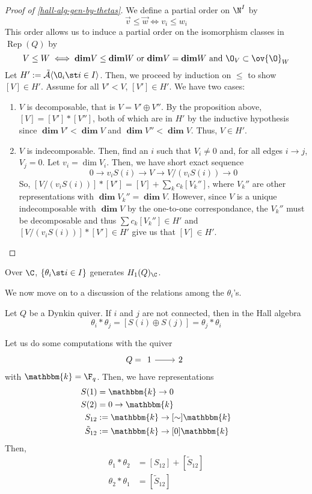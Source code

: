 \documentclass[11pt,leqno,oneside]{amsbook}
\numberwithin{thm}{section}
\newcommand{\bbk}{\mathbbm{k}} %
\newcommand{\Rep}{\operatorname{Rep}} %
\renewcommand{\Q}{Q} %
\newcommand{\grdim}{\boldsymbol{\dim}} %
\newcommand{\A}{\tilde{\mathcal{A}}}
\begin{document}
\begin{proof}[Proof of \ref{hall-alg-gen-by-thetas}]
  We define a partial order on \(\N^I\) by \[
    \vec{v} \leq \vec{w} \iff v_i \leq w_i
  \]
  This order allows us to induce a partial order on the isomorphism
  classes in \(\Rep(\Q)\) by \[
    V \leq W \iff \grdim V \leq \grdim W \text{ or } \grdim V = \grdim
    W \text{ and } \O_V \subset \ov{\O}_W
  \]
  Let \(H' := \A \langle \O_i \st i \in I \rangle\). Then, we proceed
  by induction on \(\leq\) to show \([V] \in H'\). Assume for all \(V'
  < V\), \([V'] \in H'\). We have two cases:
  \begin{enumerate}[label=(\roman*)]
  \item \(V\) is decomposable, that is \(V = V' \oplus V''\). By the
    proposition above, \([V] = [V'] 
    * [V'']\), both of which are in \(H'\) by the inductive
    hypothesis since \(\grdim V' < \grdim V\) and \(\grdim V'' <
    \grdim V\). Thus, \(V \in H'\).
  \item \(V\) is indecomposable. Then, find an \(i\) such that \(V_i
    \neq 0\) and, for all edges \(i \to j\), \(V_j = 0\). Let \(v_i =
    \dim V_i\). Then, we have short exact sequence \[
      0 \to v_i S(i) \to V \to V/(v_i S(i)) \to 0
    \]
    So, \([V/(v_i S(i))]*[V'] = [V] + \sum_k c_k [V_k'']\), where
    \(V_k''\) are other representations with \(\grdim V_k'' = \grdim
    V\). However, since \(V\) is a unique indecomposable with \(\grdim
    V\) by the one-to-one correspondance, the
    \(V_k''\) must be decomposable and thus \(\sum c_k [V_k''] \in
    H'\) and \([V/(v_i S(i))]*[V'] \in H'\) give us that \([V] \in H'\).
  \end{enumerate}
\end{proof}
\begin{cor}
  Over \(\C\), \(\{\theta_i \st i \in I\}\) generates \(H_1(\Q)_\C\).
\end{cor}
We now move on to a discussion of the relations among the
\(\theta_i\)'s.
\begin{prop}
  Let \(\Q\) be a Dynkin quiver. If \(i\) and \(j\) are not connected,
  then in the Hall algebra \[
    \theta_i * \theta_j = [S(i) \oplus S(j)] = \theta_j * \theta_i
  \]
\end{prop}
\begin{example}
  Let us do some computations with the quiver \[
    \Q =
    \begin{tikzcd}
      1 \rar & 2
    \end{tikzcd}
  \]
  with \(\bbk = \F_q\). Then, we have representations
  \begin{align*}
    S(1) & = \bbk \to 0 \\
    S(2) & = 0 \to \bbk \\
    S_{12} & := \bbk \to[\sim] \bbk \\
    \tilde{S}_{12} & := \bbk \to[0] \bbk
  \end{align*}
  Then,
  \begin{align*}
    \theta_1 * \theta_2 & = [S_{12}] + [\tilde{S}_12] \\
    \theta_2 * \theta_1 & = [\tilde{S}_{12}]
  \end{align*}
\end{example}
\end{document}
